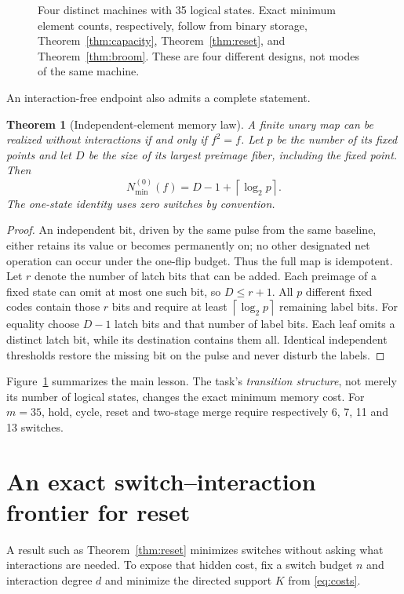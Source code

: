 \documentclass[12pt,letterpaper]{article}
\newtheorem{theorem}{Theorem}[section]
\theoremstyle{definition}\newtheorem{definition}[theorem]{Definition}
\theoremstyle{remark}\newtheorem{remark}[theorem]{Remark}
\newcommand{\Nmin}{N_{\min}}
\newcommand{\ceil}[1]{\left\lceil #1\right\rceil}
\begin{document}
\begin{figure}[ht]
\centering\resizebox{\linewidth}{!}{}
\caption{Four distinct machines with 35 logical states. Exact minimum element counts, respectively, follow from binary storage, Theorem~\ref{thm:capacity}, Theorem~\ref{thm:reset}, and Theorem~\ref{thm:broom}. These are four different designs, not modes of the same machine.}
\label{fig:tasks}
\end{figure}

An interaction-free endpoint also admits a complete statement.
\begin{theorem}[Independent-element memory law]\label{thm:independent}
A finite unary map can be realized without interactions if and only if $f^2=f$. Let $p$ be the number of its fixed points and let $D$ be the size of its largest preimage fiber, including the fixed point. Then
\begin{equation}\label{eq:independent}
\boxed{\Nmin^{(0)}(f)=D-1+\ceil{\log_2p}.}
\end{equation}
The one-state identity uses zero switches by convention.
\end{theorem}
\begin{proof}
An independent bit, driven by the same pulse from the same baseline, either retains its value or becomes permanently on; no other designated net operation can occur under the one-flip budget. Thus the full map is idempotent. Let $r$ denote the number of latch bits that can be added. Each preimage of a fixed state can omit at most one such bit, so $D\le r+1$. All $p$ different fixed codes contain those $r$ bits and require at least $\ceil{\log_2p}$ remaining label bits. For equality choose $D-1$ latch bits and that number of label bits. Each leaf omits a distinct latch bit, while its destination contains them all. Identical independent thresholds restore the missing bit on the pulse and never disturb the labels.
\end{proof}

Figure~\ref{fig:tasks} summarizes the main lesson. The task's \emph{transition structure}, not merely its number of logical states, changes the exact minimum memory cost. For $m=35$, hold, cycle, reset and two-stage merge require respectively 6, 7, 11 and 13 switches.

\section{An exact switch--interaction frontier for reset}\label{sec:frontier}
A result such as Theorem~\ref{thm:reset} minimizes switches without asking what interactions are needed. To expose that hidden cost, fix a switch budget $n$ and interaction degree $d$ and minimize the directed support $K$ from \eqref{eq:costs}.
\end{document}
